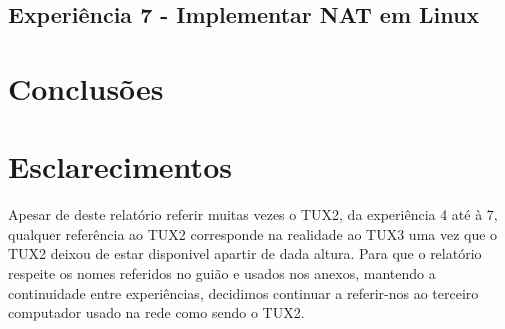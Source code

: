 \documentclass[11pt,a4paper,reqno]{report}
\numberwithin{equation}{section}
\begin{document}
\section{Experiência 7 - Implementar NAT em Linux}

\chapter{Conclusões}

\chapter{Esclarecimentos}

Apesar de deste relatório referir muitas vezes o TUX2, da experiência 4 até à 7, qualquer referência ao TUX2 corresponde na realidade ao TUX3 uma vez que o TUX2 deixou de estar disponivel apartir de dada altura. Para que o relatório respeite os nomes referidos no guião e usados nos anexos, mantendo a continuidade entre experiências, decidimos continuar a referir-nos ao terceiro computador usado na rede como sendo o TUX2.  

\end{document}
